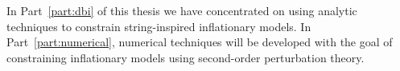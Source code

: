 In Part~\ref{part:dbi} of this thesis we have concentrated on using analytic
techniques to constrain string-inspired inflationary models. 
In Part~\ref{part:numerical},
numerical techniques will be developed with the goal of constraining
inflationary models using second-order perturbation theory.

